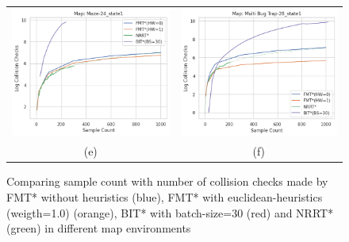 \documentclass{article}
\begin{document}
\begin{figure}[H]
{\begin{tabular}{cc}
			\includegraphics[scale=0.45]{scVcc_Maze-24_state1.png} & \includegraphics[scale=0.45]{scVcc_Multi Bug Trap-28_state1.png}  \\
			(e) & (f)  \\[6pt]
		\end{tabular}
	}
	\caption{Comparing sample count with number of collision checks made by FMT* without heuristics (blue), FMT* with euclidean-heuristics (weigth=1.0) (orange), BIT* with batch-size=30 (red) and NRRT* (green) in different map environments}
\end{figure}
\end{document}
